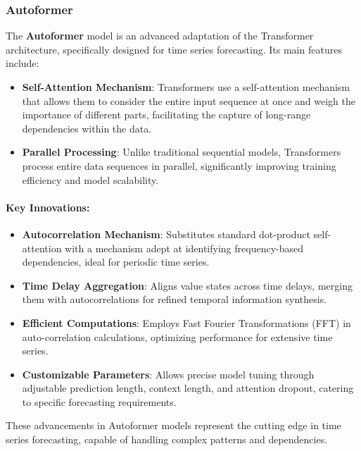 \subsubsection{Autoformer \cite{wu2022autoformer}}

The \textbf{Autoformer} model is an advanced adaptation of the Transformer architecture, specifically designed for time series forecasting. Its main features include:

\begin{itemize}
    \item \textbf{Self-Attention Mechanism}: Transformers use a self-attention mechanism that allows them to consider the entire input sequence at once and weigh the importance of different parts, facilitating the capture of long-range dependencies within the data.
    
    \item \textbf{Parallel Processing}: Unlike traditional sequential models, Transformers process entire data sequences in parallel, significantly improving training efficiency and model scalability.
\end{itemize}

\paragraph{Key Innovations:}
\begin{itemize}
    \item \textbf{Autocorrelation Mechanism}: Substitutes standard dot-product self-attention with a mechanism adept at identifying frequency-based dependencies, ideal for periodic time series.
    
    \item \textbf{Time Delay Aggregation}: Aligns value states across time delays, merging them with autocorrelations for refined temporal information synthesis.
    
    \item \textbf{Efficient Computations}: Employs Fast Fourier Transformations (FFT) in auto-correlation calculations, optimizing performance for extensive time series.
    
    \item \textbf{Customizable Parameters}: Allows precise model tuning through adjustable prediction length, context length, and attention dropout, catering to specific forecasting requirements.
\end{itemize}

These advancements in Autoformer models represent the cutting edge in time series forecasting, capable of handling complex patterns and dependencies.

